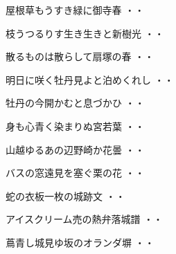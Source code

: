 \begin{shiika}屋根草もうすき緑に御寺春
\hfill{・・}\end{shiika}
\vspace{0.6cm}
\begin{shiika}枝うつるりす生き生きと新樹光
\hfill{・・}\end{shiika}
\vspace{0.6cm}
\begin{shiika}散るものは散らして扇塚の春
\hfill{・・}\end{shiika}
\vspace{0.6cm}
\begin{shiika}明日に咲く牡丹見よと泊めくれし
\hfill{・・}\end{shiika}
\vspace{0.6cm}
\begin{shiika}牡丹の今開かむと息づかひ
\hfill{・・}\end{shiika}
\vspace{0.6cm}
\begin{shiika}身も心青く染まりぬ宮若葉
\hfill{・・}\end{shiika}
\vspace{0.6cm}
\begin{shiika}山越ゆるあの辺野崎か花曇
\hfill{・・}\end{shiika}
\vspace{0.6cm}
\begin{shiika}バスの窓遠見を塞ぐ栗の花
\hfill{・・}\end{shiika}
\vspace{0.6cm}
\begin{shiika}蛇の衣板一枚の城跡文
\hfill{・・}\end{shiika}
\vspace{0.6cm}
\begin{shiika}アイスクリーム売の熱弁落城譜
\hfill{・・}\end{shiika}
\vspace{0.6cm}
\begin{shiika}蔦青し城見ゆ坂のオランダ塀
\hfill{・・}\end{shiika}
\vspace{0.6cm}
